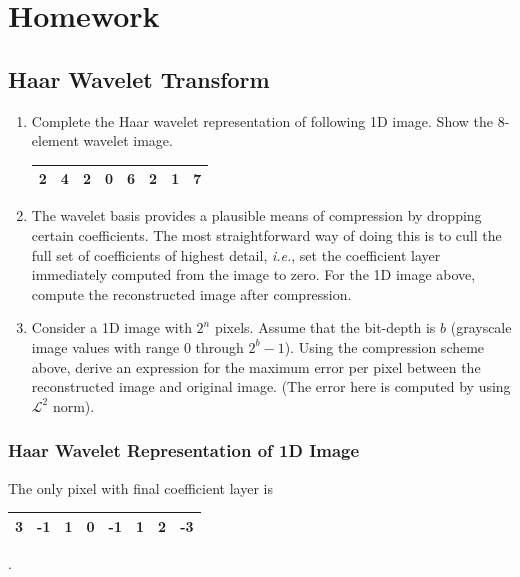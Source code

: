 \section{Homework \thesection}

\subsection{Haar Wavelet Transform}
\begin{enumerate}
	\item Complete the Haar wavelet representation of following 1D image.
	Show the 8-element wavelet image.
	\begin{center}
	\begin{tabular}{|c|c|c|c|c|c|c|c|}
	\hline	2	&	4	&	2	&	0	&	6	&	2	&	1	&	7\\	\hline
	\end{tabular}
	\end{center}
	\item The wavelet basis provides a plausible means of compression by dropping certain coefficients.
	The most straightforward way of doing this is to cull the full set of coefficients of highest detail, \textit{i.e.}, set the coefficient layer immediately computed from 	the image to zero.
	For the 1D image above, compute the reconstructed image after compression.
	\item Consider a 1D image with \(2^n\) pixels.
	Assume that the bit-depth is \(b\) (grayscale image values with range 0 through \(2^b-1\)).
	Using the compression scheme above, derive an expression for the maximum error per pixel between the reconstructed image and original image.
	(The error here is computed by using \(\mathcal{L}^2\) norm).
\end{enumerate}
\subsubsection{Haar Wavelet Representation of 1D Image}
The only pixel with final coefficient layer is
\begin{center}
\begin{tabular}{|c|c|c|c|c|c|c|c|}
\hline	3	&	-1	&	1	&	0	&	-1	&	1	&	2	&	-3\\	\hline
\end{tabular}.
\end{center}

